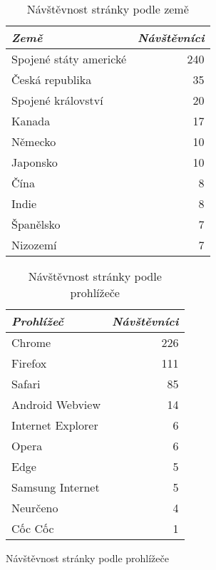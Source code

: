 \documentclass[a4paper, 12pt]{article}
\newcommand{\ra}[1]{\renewcommand{\arraystretch}{#1}} %
\begin{document}
  \begin{figure}
    \begin{minipage}[b]{0.475\textwidth}
      \begin{table}[H]
        \caption{Návštěvnost stránky podle země}
        \label{tab:Návštěvnost stránky podle země}
        \footnotesize
        \centering
        \ra{1.3}
        \begin{tabular}{lr}
          \toprule
          \emph{Země} & \emph{Návštěvníci} \\
          \midrule
          Spojené státy americké & \num{240} \\
          Česká republika	       & \num{35} \\
          Spojené království     & \num{20} \\
          Kanada                 & \num{17} \\
          Německo                & \num{10} \\
          Japonsko               & \num{10} \\
          Čína                   & \num{8} \\
          Indie                  & \num{8} \\
          Španělsko              & \num{7} \\
          Nizozemí               & \num{7} \\
          \bottomrule
        \end{tabular}
      \end{table}
    \end{minipage}\hfill
    \begin{minipage}[b]{0.475\textwidth}
      \begin{table}[H]
        \caption{Návštěvnost stránky podle prohlížeče}
        \label{tab:Návštěvnost stránky podle prohlížeče}
        \footnotesize
        \centering
        \ra{1.3}
        \begin{tabular}{lr}
          \toprule
          \emph{Prohlížeč} & \emph{Návštěvníci} \\
          \midrule
          Chrome            & \num{226} \\
          Firefox	          & \num{111} \\
          Safari            & \num{85} \\
          Android Webview   & \num{14} \\
          Internet Explorer & \num{6} \\
          Opera             & \num{6} \\
          Edge              & \num{5} \\
          Samsung Internet  & \num{5} \\
          Neurčeno          & \num{4} \\
          Cốc Cốc           & \num{1} \\
          \bottomrule
        \end{tabular}
      \end{table}
    \end{minipage}
  \end{figure}
\end{document}
